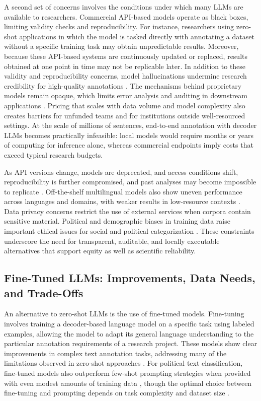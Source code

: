 \documentclass[12pt]{article}
\begin{document}
A second set of concerns involves the conditions under which many LLMs are available to researchers. Commercial API-based models operate as black boxes, limiting validity checks and reproducibility. For instance, researchers using zero-shot applications in which the model is tasked directly with annotating a dataset without a specific training task may obtain unpredictable results. Moreover, because these API-based systems are continuously updated or replaced, results obtained at one point in time may not be replicable later. In addition to these validity and reproducibility concerns, model hallucinations undermine research credibility for high-quality annotations \parencite{rateria_singh24}. The mechanisms behind proprietary models remain opaque, which limits error analysis and auditing in downstream applications \parencite{zhao_etal24}. Pricing that scales with data volume and model complexity also creates barriers for unfunded teams and for institutions outside well-resourced settings. At the scale of millions of sentences, end-to-end annotation with decoder LLMs becomes practically infeasible: local models would require months or years of computing for inference alone, whereas commercial endpoints imply costs that exceed typical research budgets. 

As API versions change, models are deprecated, and access conditions shift, reproducibility is further compromised, and past analyses may become impossible to replicate \parencite{weber_reichardt23}. Off-the-shelf multilingual models also show uneven performance across languages and domains, with weaker results in low-resource contexts \parencite{bhat_varma23, mets_etal24}. Data privacy concerns restrict the use of external services when corpora contain sensitive material. Political and demographic biases in training data raise important ethical issues for social and political categorization \parencite{mcgee23, rozado23, dong_etal23}. These constraints underscore the need for transparent, auditable, and locally executable alternatives that support equity as well as scientific reliability.

\subsection{Fine-Tuned LLMs: Improvements, Data Needs, and Trade-Offs}

An alternative to zero-shot LLMs is the use of fine-tuned models. Fine-tuning involves training a decoder-based language model on a specific task using labeled examples, allowing the model to adapt its general language understanding to the particular annotation requirements of a research project. These models show clear improvements in complex text annotation tasks, addressing many of the limitations observed in zero-shot approaches \parencite{alizadeh_etal24a, halterman_keith25}. For political text classification, fine-tuned models also outperform few-shot prompting strategies when provided with even modest amounts of training data \parencite{alizadeh_etal24a, wang_etal24}, though the optimal choice between fine-tuning and prompting depends on task complexity and dataset size \parencite{chen_etal23}.
\end{document}
